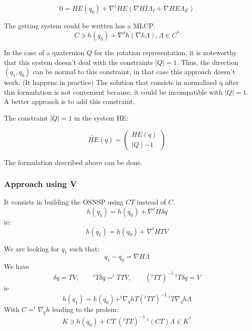 \begin{equation}
  0=HE(q_0) + \nabla ^t HE (\nabla HI  \Lambda _I + \nabla HE \Lambda _E)
\end{equation}

The getting system could be written has a MLCP:
\begin{equation}
C \ni h(q_0)+ \nabla ^t h(\nabla h\Lambda) , \Lambda \in C^*
\end{equation}

In the case of a quaternion $Q$ for the rotation representation, it is noteworthy that this system doesn't deal with the constraints $\mid Q \mid = 1$. Thus, the direction $(q_1,q_0)$ can be normal to this constraint, in that case this approach doesn't work. (It happens in practice) The solution that consists in normaliaed q after this formulation is not convenient because, it could be incompatible with $\mid Q \mid = 1$. A better approach is to add this constraint.


The constraint $\mid Q \mid = 1$ in the system HE:

\begin{equation}
  \tilde {HE}(q)= \left(\begin{array}{l}
    HE(q)\\
    \mid Q \mid -1
\end{array}\right)
\end{equation}

The formulation described above can be done.
\subsubsection{Approach using V}
It consists in building the OSNSP using $CT$ instead of $C$.
\begin{equation}
\label{NE_projV}
h(q_1) = h(q_0)+\nabla ^t H \delta q
\end{equation}
ie:
\begin{equation}
\label{NE_projV}
h(q_1) = h(q_0)+\nabla ^t H T V
\end{equation}

We are looking for $q_1$ such that:
\begin{equation}
  q_1-q_0 = \nabla H \Lambda
\end{equation}
We have
\[\delta q=TV, \qquad ^tT\delta q=^tTTV, \qquad(^tTT)^{-1}~^tT\delta q=V\]
ie
\begin{equation}
  h(q_1)=h(q_0)+^t\nabla _q hT(^tTT)^{-1}~^tT\nabla _q h\Lambda
\end{equation}
With $C=^t\nabla _q h$ leading to the prolem:
\begin{equation}
K \ni h(q_0)+ CT~ (^tTT)^{-1}~ ^t(CT)   \Lambda \in K^*
\end{equation}
